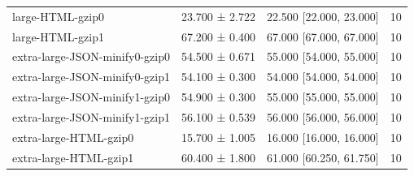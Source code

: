 \begin{tabular}{lllr}
large-HTML-gzip0 & 23.700 ± 2.722 & 22.500 [22.000, 23.000] & 10 \\
large-HTML-gzip1 & 67.200 ± 0.400 & 67.000 [67.000, 67.000] & 10 \\
extra-large-JSON-minify0-gzip0 & 54.500 ± 0.671 & 55.000 [54.000, 55.000] & 10 \\
extra-large-JSON-minify0-gzip1 & 54.100 ± 0.300 & 54.000 [54.000, 54.000] & 10 \\
extra-large-JSON-minify1-gzip0 & 54.900 ± 0.300 & 55.000 [55.000, 55.000] & 10 \\
extra-large-JSON-minify1-gzip1 & 56.100 ± 0.539 & 56.000 [56.000, 56.000] & 10 \\
extra-large-HTML-gzip0 & 15.700 ± 1.005 & 16.000 [16.000, 16.000] & 10 \\
extra-large-HTML-gzip1 & 60.400 ± 1.800 & 61.000 [60.250, 61.750] & 10 \\
\bottomrule
\end{tabular}

